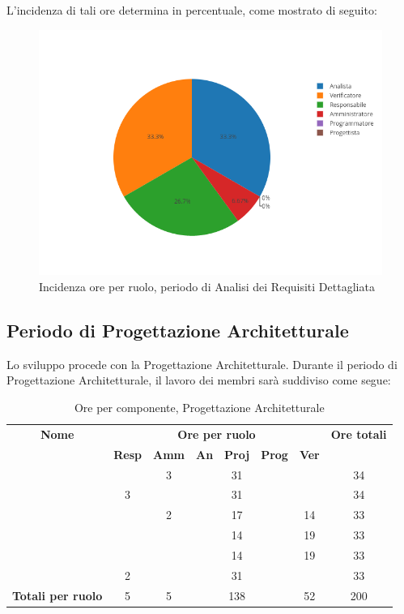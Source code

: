 L'incidenza di tali ore determina in percentuale, come mostrato di seguito:
\begin{figure}[H]
	\centering
	\includegraphics[scale=0.6]{img/AnalisiRequisitiDettaglio.png}
	\caption{Incidenza ore per ruolo, periodo di Analisi dei Requisiti Dettagliata}
\end{figure}

\newpage
\subsection{Periodo di Progettazione Architetturale}
Lo sviluppo procede con la Progettazione Architetturale. Durante il periodo di Progettazione Architetturale, il lavoro dei membri sarà suddiviso come segue:

\begin{table}[H]
	\begin{center}
		\begin{tabular}{|c|c|c|c|c|c|c|c|}
			\hline
			\textbf{Nome} & \multicolumn{6}{c|}{\textbf{Ore per ruolo}} & \textbf{Ore totali} \\\cline{2-7}
			& \textbf{Resp} & \textbf{Amm} & \textbf{An} & \textbf{Proj} & \textbf{Prog} & \textbf{Ver} & \\
			\hline
			\MC			&		&	3	&		&	31	&		&		&   34	\\
			\hline
			\AN			&	3	&		&		&	31	&		&		& 	34	\\
			\hline
			\DAN		&		&	2	&		&	17	&		&	14	&	33	\\
			\hline
			\AS			&		&	 	&	 	&	14	&	 	& 	19	&	33	\\
			\hline
			\NS 		&		&		&		&	14	&		& 	19	&	33	\\
			\hline
			\DS			& 	2	&		&		&	31	&		&		&	33	\\
			\hline
			\textbf{Totali per ruolo}	& 	5	&	5	&		&  138	&		&	52	&	200	\\
			\hline
		\end{tabular}
	\end{center}
	\caption{Ore per componente, Progettazione Architetturale}
\end{table}

